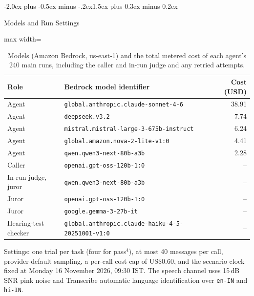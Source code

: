 \documentclass[10pt]{article}
\makeatletter
\renewcommand\section{\@startsection{section}{1}{\z@}%
  {-2.0ex plus -0.5ex minus -.2ex}{1.5ex plus 0.3ex minus 0.2ex}{\large\scshape\raggedright}}
\makeatother
\begin{document}
\section{Models and Run Settings}\label{app:models}
\begin{table}[h]
\centering\footnotesize
\caption{Models (Amazon Bedrock, us-east-1) and the total metered cost of each agent's 240 main
runs, including the caller and in-run judge and any retried attempts.}
\label{tab:models}
\begin{adjustbox}{max width=\linewidth}
\begin{tabular}{l l r}
\toprule
Role & Bedrock model identifier & Cost (USD) \\
\midrule
Agent & \texttt{global.anthropic.claude-sonnet-4-6} & 38.91 \\
Agent & \texttt{deepseek.v3.2} & 7.74 \\
Agent & \texttt{mistral.mistral-large-3-675b-instruct} & 6.24 \\
Agent & \texttt{global.amazon.nova-2-lite-v1:0} & 4.41 \\
Agent & \texttt{qwen.qwen3-next-80b-a3b} & 2.28 \\
Caller & \texttt{openai.gpt-oss-120b-1:0} & -- \\
In-run judge, juror & \texttt{qwen.qwen3-next-80b-a3b} & -- \\
Juror & \texttt{openai.gpt-oss-120b-1:0} & -- \\
Juror & \texttt{google.gemma-3-27b-it} & -- \\
Hearing-test checker & \texttt{global.anthropic.claude-haiku-4-5-20251001-v1:0} & -- \\
\bottomrule
\end{tabular}
\end{adjustbox}
\end{table}

Settings: one trial per task (four for pass$^4$), at most 40 messages per call, provider-default
sampling, a per-call cost cap of US\$0.60, and the scenario clock fixed at Monday 16 November
2026, 09:30 IST. The speech channel uses 15\,dB SNR pink noise and Transcribe automatic language
identification over \texttt{en-IN} and \texttt{hi-IN}.
\end{document}
